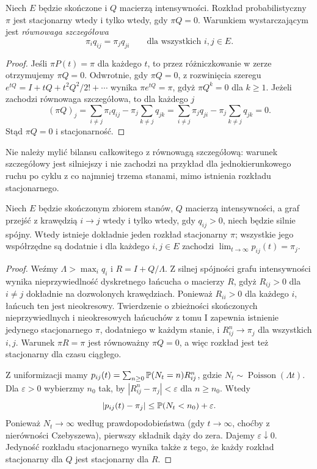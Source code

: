 \begin{twierdzenie}
Niech $E$ będzie skończone i $Q$ macierzą intensywności.
Rozkład probabilistyczny $\pi$ jest stacjonarny wtedy i tylko
wtedy, gdy $\pi Q=0$. Warunkiem wystarczającym jest
\emph{równowaga szczegółowa}
\[
\pi_iq_{ij}=\pi_jq_{ji}\qquad\text{dla wszystkich }i,j\in E.
\]
\end{twierdzenie}
\begin{proof}
Jeśli $\pi P(t)=\pi$ dla każdego $t$, to przez różniczkowanie
w zerze otrzymujemy $\pi Q=0$.
Odwrotnie, gdy $\pi Q=0$, z rozwinięcia szeregu
$e^{tQ}=I+tQ+t^2Q^2/2!+\cdots$ wynika
$\pi e^{tQ}=\pi$, gdyż $\pi Q^k=0$ dla $k\ge1$.
Jeżeli zachodzi równowaga szczegółowa, to dla każdego $j$
\[
(\pi Q)_j=\sum_{i\ne j}\pi_iq_{ij}-\pi_j\sum_{k\ne j}q_{jk}
=\sum_{i\ne j}\pi_jq_{ji}-\pi_j\sum_{k\ne j}q_{jk}=0.
\]
Stąd $\pi Q=0$ i stacjonarność.
\end{proof}

Nie należy mylić bilansu całkowitego z równowagą szczegółową:
warunek szczegółowy jest silniejszy i nie zachodzi na przykład
dla jednokierunkowego ruchu po cyklu z co najmniej trzema
stanami, mimo istnienia rozkładu stacjonarnego.

\begin{twierdzenie}
Niech $E$ będzie skończonym zbiorem stanów, $Q$ macierzą
intensywności, a graf przejść z krawędzią $i\to j$ wtedy
i tylko wtedy, gdy $q_{ij}>0$, niech będzie silnie spójny.
Wtedy istnieje dokładnie jeden rozkład stacjonarny $\pi$;
wszystkie jego współrzędne są dodatnie i dla każdego
$i,j\in E$ zachodzi
$\lim_{t\to\infty}p_{ij}(t)=\pi_j$.
\end{twierdzenie}
\begin{proof}
Weźmy $\Lambda>\max_i q_i$ i $R=I+Q/\Lambda$.
Z silnej spójności grafu intensywności wynika
nieprzywiedlność dyskretnego łańcucha o macierzy $R$,
gdyż $R_{ij}>0$ dla $i\ne j$ dokładnie na dozwolonych
krawędziach. Ponieważ $R_{ii}>0$ dla każdego $i$,
łańcuch ten jest nieokresowy.
Twierdzenie o zbieżności skończonych nieprzywiedlnych
i nieokresowych łańcuchów z tomu I zapewnia istnienie
jedynego stacjonarnego $\pi$, dodatniego w każdym stanie,
i $R^n_{ij}\to\pi_j$ dla wszystkich $i,j$.
Warunek $\pi R=\pi$ jest równoważny $\pi Q=0$,
a więc rozkład jest też stacjonarny dla czasu ciągłego.

Z uniformizacji mamy
$p_{ij}(t)=\sum_{n\ge0}\mathbb{P}(N_t=n)R^n_{ij}$,
gdzie $N_t\sim\operatorname{Poisson}(\Lambda t)$.
Dla $\varepsilon>0$ wybierzmy $n_0$ tak, by
$|R^n_{ij}-\pi_j|<\varepsilon$ dla $n\ge n_0$.
Wtedy
\[
|p_{ij}(t)-\pi_j|
\le\mathbb{P}(N_t<n_0)+\varepsilon.
\]
Ponieważ $N_t\to\infty$ według prawdopodobieństwa
(gdy $t\to\infty$, choćby z nierówności Czebyszewa),
pierwszy składnik dąży do zera. Dajemy $\varepsilon\downarrow0$.
Jedyność rozkładu stacjonarnego wynika także z tego,
że każdy rozkład stacjonarny dla $Q$ jest stacjonarny dla $R$.
\end{proof}

